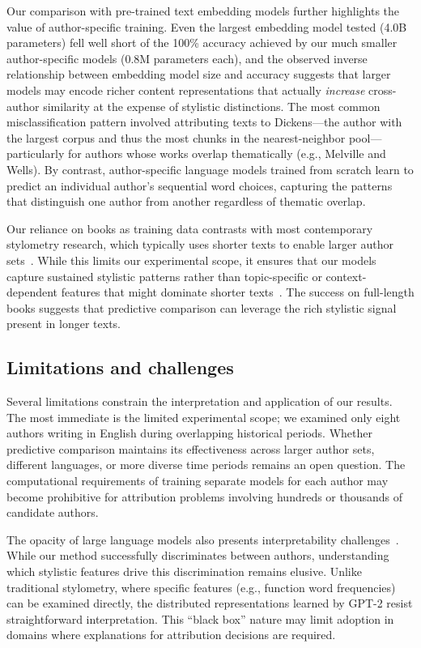 \documentclass[11pt]{article}
\begin{document}
Our comparison with pre-trained text embedding models further highlights the
value of author-specific training. Even the largest embedding model tested
(4.0B parameters) fell well short of the 100\% accuracy achieved by our much
smaller author-specific models (0.8M parameters each), and the observed inverse
relationship between embedding model size and accuracy suggests that larger
models may encode richer content representations that actually
\textit{increase} cross-author similarity at the expense of stylistic
distinctions. The most common misclassification pattern involved attributing
texts to Dickens---the author with the largest corpus and thus the most chunks
in the nearest-neighbor pool---particularly for authors whose works overlap
thematically (e.g., Melville and Wells). By contrast, author-specific language
models trained from scratch learn to predict an individual author's sequential
word choices, capturing the patterns that distinguish one author from another
regardless of thematic overlap.

Our reliance on books as training data contrasts with most contemporary
stylometry research, which typically uses shorter texts to enable larger author
sets~\citep{TyoEtal22}. While this limits our experimental scope, it ensures
that our models capture sustained stylistic patterns rather than
topic-specific or context-dependent features that might dominate shorter
texts~\citep{FincBosc24}. The success on full-length books suggests that
predictive comparison can leverage the rich stylistic signal present in
longer texts.

\subsection{Limitations and challenges}

Several limitations constrain the interpretation and application of our results.
The most immediate is the limited experimental scope; we examined only eight
authors writing in English during overlapping historical periods. Whether
predictive comparison maintains its effectiveness across larger author sets,
different languages, or more diverse time periods remains an open question.
The computational requirements of training separate models for each author may
become prohibitive for attribution problems involving hundreds or thousands of
candidate authors.

The opacity of large language models also presents interpretability
challenges~\citep{SchuEtal20}. While our method successfully discriminates
between authors, understanding which stylistic features drive this
discrimination remains elusive. Unlike traditional stylometry, where specific
features (e.g., function word frequencies) can be examined directly, the
distributed representations learned by GPT-2 resist straightforward
interpretation. This ``black box'' nature may limit adoption in domains where
explanations for attribution decisions are required.
\end{document}
